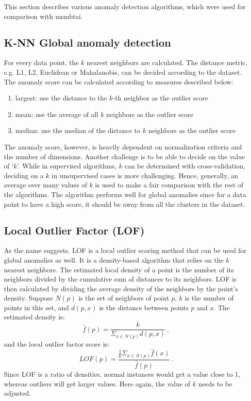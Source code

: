 \documentclass[fleqn,usenatbib]{mnras}
\newcommand{\be}{\begin{equation}}
\newcommand{\ee}{\end{equation}}
\def\be{\begin{equation}}
\def\ee{\end{equation}}
\begin{document}
This section describes various anomaly detection algorithms, which were used for comparison with \acrshort{msmbtai}.

\subsection{K-NN Global anomaly detection}

For every data point, the $k$ nearest neighbors are calculated. The distance metric, e.g. L1, L2, Euclidean or Mahalanobis, can be decided according to the dataset. The anomaly score can be calculated according to measures described below:
\begin{enumerate}
\item largest: use the distance to the $k$-th neighbor as the outlier score
\item mean: use the average of all $k$ neighbors as the outlier score
\item median: use the median of the distance to $k$ neighbors as the outlier score
\end{enumerate}

The anomaly score, however, is heavily dependent on normalization criteria and the number of dimensions. Another challenge is to be able to decide on the value of `$k$'. While in supervised algorithms, $k$ can be determined with cross-validation, deciding on a $k$ in unsupervised cases is more challenging. Hence, generally, an average over many values of $k$ is used to make a fair comparison with the rest of the algorithms. The algorithm performs well for global anomalies since for a data point to have a high score, it should be away from all the clusters in the dataset.

\subsection{Local Outlier Factor (LOF)}

As the name suggests, LOF is a local outlier scoring method that can be used for global anomalies as well. It is a density-based algorithm that relies on the $k$ nearest neighbors. The estimated local density of a point is the number of its neighbors divided by the cumulative sum of distances to its neighbors. LOF is then calculated by dividing the average density of the neighbors by the point's density. 
Suppose $N(p)$ is the set of neighbors of point $p$, $k$ is the number of points in this set, and $d(p,x)$ is the distance between points $p$ and $x$. The estimated density is:
\be
\hat{f}(p) = \frac{k}{\Sigma_{x\in N(p)} d(p,x)}\,,
\ee
and the local outlier factor score is:
\be
LOF(p) = \frac{\frac{1}{k}\Sigma_{x\in N(p)}\hat{f}(x)}{\hat{f}(p)}\,.
\ee
Since LOF is a ratio of densities, normal instances would get a value close to 1, whereas outliers will get larger values. Here again, the value of $k$ needs to be adjusted.
\end{document}
